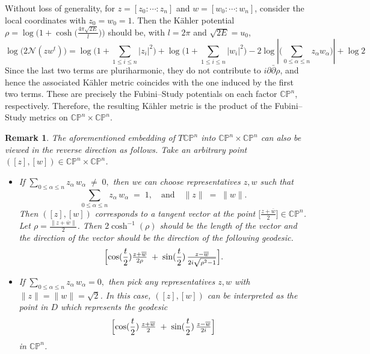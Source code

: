 \documentclass[a4paper, 12pt]{article}
\newcommand{\bCP}{\mathbb{CP}^n}
\newcommand{\tCP}{\mathbb{CP}^n\times\mathbb{CP}^n}
\newtheorem{rem}[thm]{Remark}
\begin{document}
Without loss of generality, for $z=[z_0:\cdots:z_n]$ and $w=[w_0:\cdots:w_n]$, consider the local coordinates with $z_0=w_0=1$. Then the K\"ahler potential $\rho=\log\bigl(1+\cosh\bigl(\frac{4\pi\sqrt{2E}}{l}\bigr)\bigr)$ should be, with $l=2\pi$ and $\sqrt{2E}=u_0$,
$$\log\bigl(2\mathscr{N}(zw^t)\bigr)=\log\bigl(1+\sum_{1\le i\le n}|z_i|^2\bigr)+\log\bigl(1+\sum_{1\le i\le n}|w_i|^2\bigr)-2 \log|\bigl(\sum_{0\le \alpha \le n}z_\alpha w_\alpha\bigr)|+\log 2$$
Since the last two terms are pluriharmonic, they do not contribute to $i\partial\bar{\partial}\rho$, and hence the associated K\"ahler metric coincides with the one induced by the first two terms. These are precisely the Fubini--Study potentials on each factor $\bCP$, respectively. Therefore, the resulting K\"ahler metric is the product of the Fubini--Study metrics on $\tCP$.
\begin{rem}\label{inverse}
The aforementioned embedding of \(T\bCP\) into \(\tCP\) can also be viewed in the reverse direction as follows. Take an arbitrary point \(
([z],[w])\in\tCP\). 

\begin{itemize}
\item If \(\sum_{0 \le \alpha \le n} z_\alpha \,w_\alpha \;\neq\;0,\) then we can choose representatives \(z,w\) such that 
\[
\sum_{0\le \alpha \le n} z_\alpha \,w_\alpha \;=\;1,
\quad
\text{and}
\quad
\|z\| \;=\;\|w\|.
\]
Then \(([z],[w])\) corresponds to a tangent vector at the point 
\(\bigl[\tfrac{z+\overline{w}}{2}\bigr]\in\bCP\). Let $\rho=\frac{\|z+\overline{w}\|}{2}$. Then $2\cosh^{-1}(\rho)$ should be the length of the vector and the direction of the vector should be the direction of the following geodesic.
\[
\Bigl[\cos(\frac{t}{2})\tfrac{z+\overline{w}}{2\rho} \;+\; \sin(\frac{t}{2})\,\tfrac{z-\overline{w}}{2i\sqrt{\rho^2-1}}\Bigr]. 
\]

\item If \(\sum_{0 \le \alpha \le n} z_\alpha \,w_\alpha = 0,\) then pick any representatives \(z,w\) with 
\(\|z\|=\|w\|=\sqrt{2}\). In this case, \(([z],[w])\) can be interpreted as the point in $D$ which represents the geodesic
\[
\Bigl[\cos(\frac{t}{2})\,\tfrac{z+\overline{w}}{2}
\;+\;
\sin(\frac{t}{2})\,\tfrac{z-\overline{w}}{2i}\Bigr]
\]
in \(\bCP\).
\end{itemize}
\end{rem}
\end{document}

